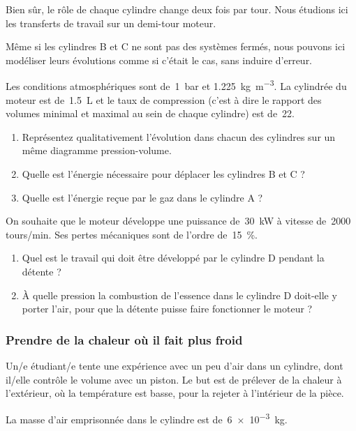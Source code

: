 		Bien sûr, le rôle de chaque cylindre change deux fois par tour. Nous étudions ici les transferts de travail sur un demi-tour moteur.

		Même si les cylindres B et C ne sont pas des systèmes fermés, nous pouvons ici modéliser leurs évolutions comme si c’était le cas, sans induire d’erreur.

		Les conditions atmosphériques sont de~\SI{1}{\bar} et \SI{1,225}{\kilogram\per\metre\cubed}.	La cylindrée du moteur est de~\SI{1,5}{\liter} et le taux de compression (c’est à dire le rapport des volumes minimal et maximal au sein de chaque cylindre) est de~\num{22}. 
		
		\begin{enumerate}
			\item Représentez qualitativement l’évolution dans chacun des cylindres sur un même diagramme pression-volume.
			\item Quelle est l’énergie nécessaire pour déplacer les cylindres B et C ?
			\item Quelle est l’énergie reçue par le gaz dans le cylindre A ?
		\end{enumerate}
		
		On souhaite que le moteur développe une puissance de~\SI{30}{\kilo\watt} à vitesse de~\num{2000} \si{tours/min}. Ses pertes mécaniques sont de l’ordre de~\SI{15}{\percent}.
		
		\begin{enumerate}
			\item Quel est le travail qui doit être développé par le cylindre D pendant la détente ?
			\item À quelle pression la combustion de l’essence dans le cylindre D doit-elle y porter l’air, pour que la détente puisse faire fonctionner le moteur ?
		\end{enumerate}



\subsubsection{Prendre de la chaleur où il fait plus froid}
\label{exo_prendre_de_la_chaleur}

	Un/e étudiant/e tente une expérience avec un peu d’air dans un cylindre, dont il/elle contrôle le volume avec un piston. Le but est de prélever de la chaleur à l’extérieur, où la température est basse, pour la rejeter à l’intérieur de la pièce.

	La masse d’air emprisonnée dans le cylindre est de~\SI{6e-3}{\kilogram}.
	
